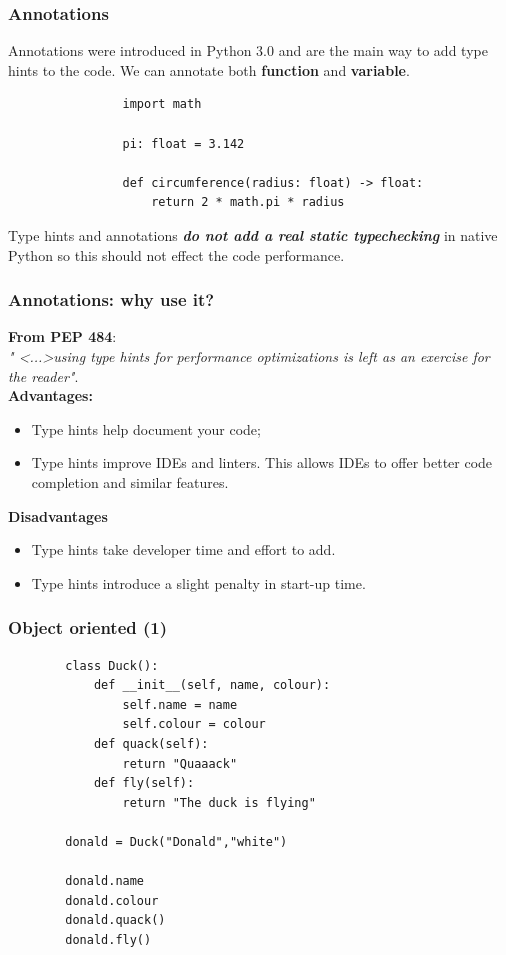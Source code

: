 \documentclass[xcolor ={table,usenames,dvipsnames}]{beamer}
\theoremstyle{definition}
\begin{document}
%		

	\begin{frame}[fragile]
		\frametitle{Annotations}
			Annotations were introduced in Python 3.0 and are the main way to add type hints to the code. We can annotate both \textbf{function} and \textbf{variable}.
			
			\begin{lstlisting}
				import math
				
				pi: float = 3.142
				
				def circumference(radius: float) -> float:
					return 2 * math.pi * radius
			\end{lstlisting}
			
			Type hints and annotations \textbf{\textit{do not add a real static typechecking}} in native Python so this should not effect the code performance.\\
	\end{frame}

	\begin{frame}
		\frametitle{Annotations: why use it?}
		\textbf{From PEP 484}:\\
		\textit{" <...>using type hints for performance optimizations is left as an exercise for the reader"}.\\
		
		\textbf{Advantages:}
		\begin{itemize}
			\item Type hints help document your code;
			\item Type hints improve IDEs and linters. This allows IDEs to offer better code completion and similar features.
		\end{itemize}
		\textbf{Disadvantages}
		\begin{itemize}
			\item Type hints take developer time and effort to add.
			\item Type hints introduce a slight penalty in start-up time.
		\end{itemize}
	\end{frame}

	\begin{frame}[fragile]
		\frametitle{Object oriented (1)}
	\begin{lstlisting}
		class Duck():
			def __init__(self, name, colour):
				self.name = name
				self.colour = colour
			def quack(self):
				return "Quaaack"
			def fly(self):
				return "The duck is flying"
		
		donald = Duck("Donald","white")
				
		donald.name
		donald.colour
		donald.quack()
		donald.fly()
		\end{lstlisting}
	\end{frame}
\end{document}
